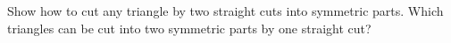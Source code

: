 Show how to cut any triangle by two straight cuts into symmetric parts. Which triangles can be cut into two symmetric parts by one straight cut?
